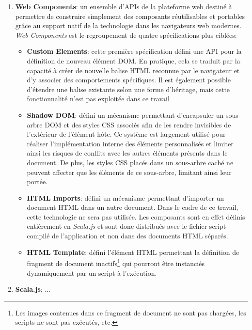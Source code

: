 \begin{enumerate}
	\item \textbf{Web Components}: un ensemble d'APIs de la plateforme web destiné à permettre de construire simplement des composants réutilisables et portables grâce au support natif de la technologie dans les navigateurs web modernes. \textit{Web Components} est le regroupement de quatre spécifications plus ciblées:
	\begin{itemize}
		\item \textbf{Custom Elements}: cette première spécification défini une API pour la définition de nouveau élément DOM. En pratique, cela se traduit par la capacité à créer de nouvelle balise HTML reconnue par le navigateur et d'y associer des comportements spécifiques. Il est également possible d'étendre une balise existante selon une forme d'héritage, mais cette fonctionnalité n'est pas exploitée dans ce travail
		
		\item \textbf{Shadow DOM}: défini un mécanisme permettant d'encapsuler un sous-arbre DOM et des styles CSS associés afin de les rendre invisibles de l'extérieur de l'élément hôte. Ce système est largement utilisé pour réaliser l'implémentation interne des éléments personnalisés et limiter ainsi les risques de conflits avec les autres éléments présents dans le document. De plus, les styles CSS placés dans un sous-arbre caché ne peuvent affecter que les éléments de ce sous-arbre, limitant ainsi leur portée.
		
		\item \textbf{HTML Imports}: défini un mécanisme permettant d'importer un document HTML dans un autre document. Dans le cadre de ce travail, cette technologie ne sera pas utilisée. Les composants sont en effet définis entièrement en \textit{Scala.js} et sont donc distribués avec le fichier script compilé de l'application et non dans des documents HTML séparés.
		
		\item \textbf{HTML Template}: défini l'élément HTML  permettant la définition de fragment de document inactifs\footnote{Les images contenues dans ce fragment de document ne sont pas chargées, les scripts ne sont pas exécutés, etc.} qui pourront être instanciés dynamiquement par un script à l'exécution.
	\end{itemize}

	\item \textbf{Scala.js}: ...
\end{enumerate}